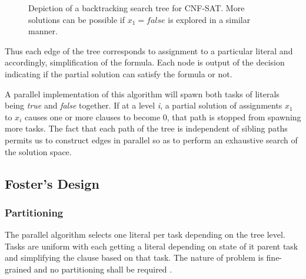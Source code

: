 \documentclass[a4paper]{article}
\begin{document}
\begin{figure}[!htbp]
\begin{center}
\end{center}
\caption{Depiction of a backtracking search tree for CNF-SAT. More solutions can be possible if $x_{1} = false$ is explored in a similar manner.}\label{fig:cnfsat}
\end{figure}

Thus each edge of the tree corresponds to assignment to a particular literal and accordingly, simplification of the formula. Each node is output of the decision indicating if the partial solution can satisfy the formula or not.

A parallel implementation of this algorithm will spawn both tasks of literals being \emph{true} and \emph{false} together. If at a level \emph{i}, a partial solution of assignments $x_{1}$ to $x_{i}$ causes one or more clauses to become 0, that path is stopped from spawning more tasks. The fact that each path of the tree is independent of sibling paths permits us to construct edges in parallel so as to perform an exhaustive search of the solution space.
\subsection*{Foster's Design}
\subsubsection*{Partitioning}
The parallel algorithm selects one literal per task depending on the tree level. Tasks are uniform with each getting a literal depending on state of it parent task and simplifying the clause based on that task. The nature of problem is fine-grained and no partitioning shall be required \cite{foster}.
\end{document}
